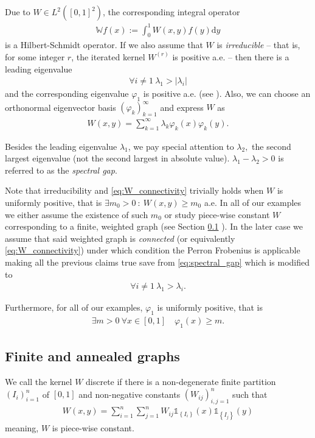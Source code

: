 \documentclass{article}
\renewcommand{\d}{\mathrm{d}}
\newcommand{\W}{\mathbb{W}}
\newcommand{\1}[1]{{\mathds{1}}_{\left\{#1\right\}}}
\begin{document}
Due to $W \in L^2 \left([0,1]^2 \right) $, the corresponding integral operator
\begin{align*}
\W f(x):=\int_{0}^{1} W(x,y) f(y) \d y
\end{align*}
is a Hilbert-Schmidt operator. If we also assume that $W$ is \emph{irreducible} -- that is, for some integer $r$, the iterated kernel $W^{(r)}$ is positive a.e. -- then there is a leading eigenvalue
\begin{align}
\label{eq:spectral_gap}
\forall i \neq 1 \ \lambda_1>|\lambda_i|
\end{align}
and the corresponding eigenvalue $\varphi_1$ is positive a.e. (see \cite{generalized_Jentzsch}). Also, we can choose an orthonormal eigenvector basis $(\varphi_k)_{k=1}^{\infty}$ and express $W$ as
\begin{align*}
W(x,y)=\sum_{k=1}^{\infty} \lambda_k \varphi_k(x)\varphi_k(y).
\end{align*}

Besides the leading eigenvalue $\lambda_1$, we pay special attention to $\lambda_2,$ the second largest eigenvalue (not the second largest in absolute value). $\lambda_1-\lambda_2>0$ is referred to as the \emph{spectral gap}.

Note that irreducibility and \eqref{eq:W_connectivity} trivially holds when $W$ is uniformly positive, that is $\exists m_0>0 \ : \ W(x,y)\geq m_0$ a.e. In all of our examples we either assume the existence of such $m_0$ or study piece-wise constant $W$ corresponding to a finite, weighted graph (see Section \ref{s:discrete} ). In the later case we assume that said weighted graph is \emph{connected} (or equivalently \eqref{eq:W_connectivity}) under which condition the Perron Frobenius is applicable making all the previous claims true save from \eqref{eq:spectral_gap} which is modified to
\begin{align}
\forall i \neq 1 \ \lambda_1>\lambda_i.
\end{align}

Furthermore, for all of our examples, $\varphi_1$ is uniformly positive, that is
\begin{align}
\label{eq:unifpos}
\exists m>0 \ \forall x \in [0,1] \quad \varphi_1(x) \geq m.
\end{align}

\subsection{Finite and annealed graphs}
\label{s:discrete}
We call the kernel $W$ discrete if there is a non-degenerate finite  partition $(I_i)_{i=1}^{n}$ of $[0,1]$  and non-negative constants $\left(W_{ij}\right)_{i,j=1}^n$ such that
\begin{align*}
W(x,y)=\sum_{i=1}^{n}\sum_{j=1}^n W_{ij} \1{I_i}(x) \1{I_j}(y)	
\end{align*}
meaning, $W$ is piece-wise constant. 
\end{document}
